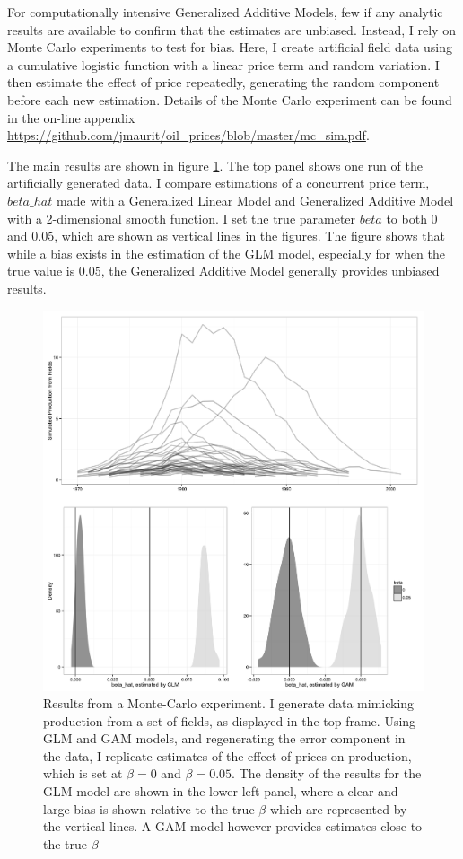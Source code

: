 \documentclass[12pt]{article}
\begin{document}
For computationally intensive Generalized Additive Models, few if any analytic results are available to confirm that the estimates are unbiased.  Instead, I rely on Monte Carlo experiments to test for bias.  Here, I create artificial field data using a cumulative logistic function with a linear price term and random variation. I then estimate the effect of price repeatedly, generating the random component before each new estimation. Details of the Monte Carlo experiment can be found in the on-line appendix \url{https://github.com/jmaurit/oil_prices/blob/master/mc_sim.pdf}.  

The main results are shown in figure \ref{mc_results}.  The top panel shows one run of the artificially generated data. I compare estimations of a concurrent price term, $beta\_hat$ made with a Generalized Linear Model and Generalized Additive Model with a 2-dimensional smooth function.  I set the true parameter $beta$ to both $0$ and $0.05$, which are shown as vertical lines in the figures.  The figure shows that while a bias exists in the estimation of the GLM model, especially for when the true value is $0.05$, the Generalized Additive Model generally provides unbiased results. 

\begin{figure}
	\includegraphics[width=1\textwidth]{figures/mc_plot.png}
	\caption{Results from a Monte-Carlo experiment. I generate data mimicking production from a set of fields, as displayed in the top frame. Using GLM and GAM models, and regenerating the error component in the data, I replicate estimates of the effect of prices on production, which is set at $\beta = 0$ and $\beta=0.05$. The density of the results for the GLM model are shown in the lower left panel, where a clear and large bias is shown relative to the true $\beta$ which are represented by the vertical lines.  A GAM model however provides estimates close to the true $\beta$}
	\label{mc_results}
\end{figure}
\end{document}
